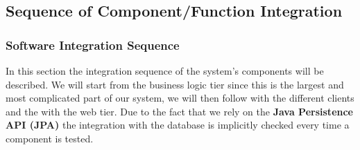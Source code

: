 \subsection{Sequence of Component/Function Integration}

\subsubsection{Software Integration Sequence}
In this section the integration sequence of the system's components will be
described. We will start from the business logic tier since this is the
largest and most complicated part of our system, we will then follow with the
different clients and the with the web tier. Due to the fact that we rely on the
\textbf{Java Persistence API (JPA)} the integration with the database is
implicitly checked every time a component is tested.


